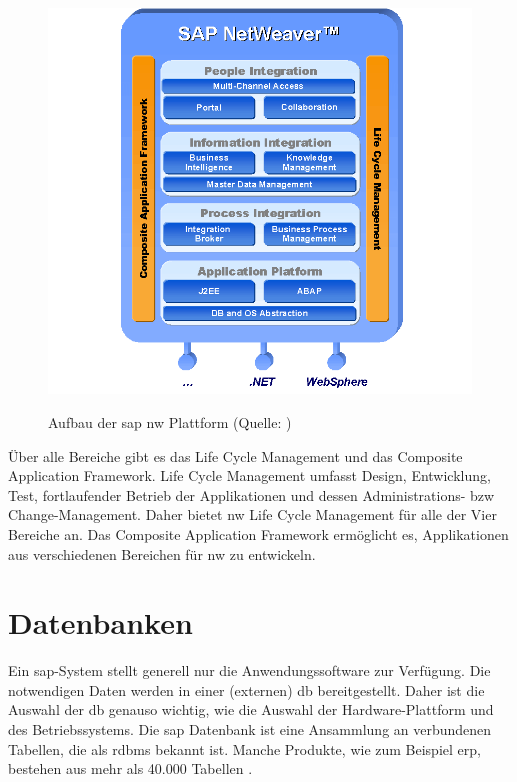 \begin{figure}[H]
	\begin{center}
	\includegraphics[width=1\linewidth]{grafiken/NetWeaver.png}
	\vspace{-20pt}
	\caption{Aufbau der \gls{sap} \gls{nw} Plattform (Quelle: \cite{NWGrundlagen})}
	\vspace{-10pt}
	\label{abb:SAPNWGrundlagen}
	\end{center}
\end{figure}

Über alle Bereiche gibt es das Life Cycle Management und das Composite Application Framework. Life Cycle Management umfasst Design, Entwicklung, Test, fortlaufender Betrieb der Applikationen und dessen Administrations- \gls{bzw} Change-Management. Daher bietet \gls{nw} Life Cycle Management für alle der Vier Bereiche an.
Das Composite Application Framework ermöglicht es, Applikationen aus verschiedenen Bereichen für \gls{nw} zu entwickeln.

\section{Datenbanken}
Ein \gls{sap}-System stellt generell nur die Anwendungssoftware zur Verfügung. Die notwendigen Daten werden in einer (externen) \gls{db} bereitgestellt. Daher ist die Auswahl der \gls{db} genauso wichtig, wie die Auswahl der Hardware-Plattform und des Betriebssystems.
Die \gls{sap} Datenbank ist eine Ansammlung an verbundenen Tabellen, die als \gls{rdbms} bekannt ist. Manche Produkte, wie zum Beispiel \gls{erp}, bestehen aus mehr als 40.000 Tabellen \cite{SAPin24hrs}.

